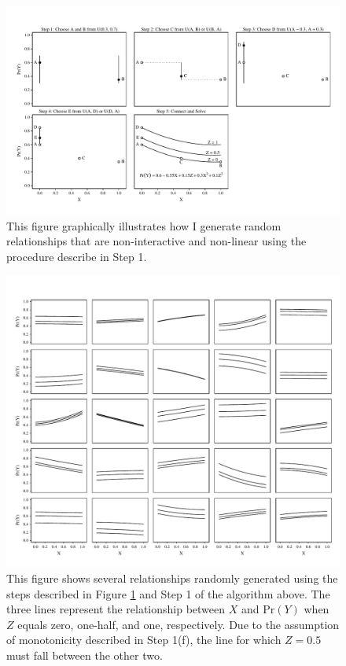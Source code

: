\documentclass[12pt]{article}
\begin{document}
\begin{appendix}
        \begin{figure}[h]
        \begin{center}
        \includegraphics[width = \linewidth]{fig/fig_choose_relationship.pdf}
        \end{center}\caption{This figure graphically illustrates how I generate random relationships that are non-interactive and non-linear using the procedure describe in Step 1.}\label{fig:choose_relationship}
        \end{figure}
        
 
              \begin{figure}[h]
        \begin{center}
        \includegraphics[width = \linewidth]{fig/fig_relationship_sample.pdf}
        \end{center}\caption{This figure shows several relationships randomly generated using the steps described in Figure \ref{fig:choose_relationship} and Step 1 of the algorithm above. The three lines represent the relationship between $X$ and $\text{Pr}(Y)$ when $Z$ equals zero, one-half, and one, respectively. Due to the assumption of monotonicity described in Step 1(f), the line for which $Z = 0.5$ must fall between the other two.}\label{fig:relationship_sample}
        \end{figure}
        

\end{appendix}
\end{document}
